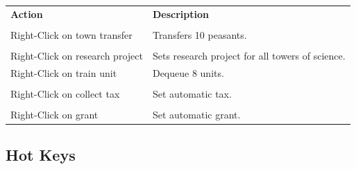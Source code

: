 \begin{tabular}{p{2in} p{2in}}
    \textbf{Action} & \textbf{Description} \\ \\  
    Right-Click on town transfer & Transfers 10 peasants. \\ \\
    Right-Click on research project & Sets research project for all towers of science. \\
    Right-Click on train unit & Dequeue 8 units. \\ \\
    Right-Click on collect tax & Set automatic tax. \\ \\
    Right-Click on grant & Set automatic grant. \\
\end{tabular}

\subsection{Hot Keys}


